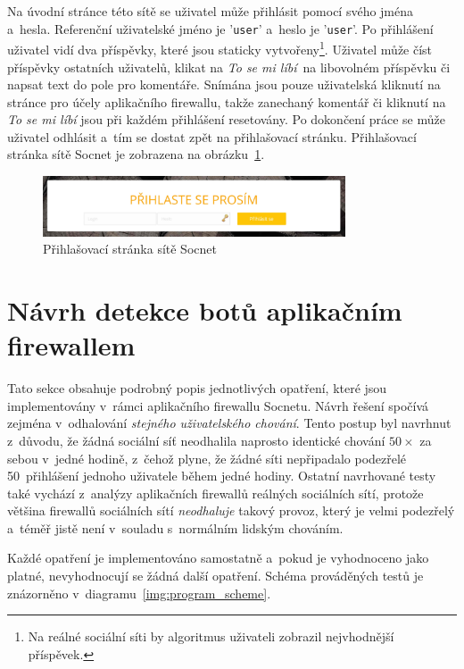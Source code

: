 Na úvodní stránce této sítě se uživatel může přihlásit pomocí svého jména a~hesla. Referenční uživatelské jméno je '\texttt{user}' a~heslo je '\texttt{user}'. Po přihlášení uživatel vidí dva příspěvky, které jsou staticky vytvořeny\footnote{Na reálné sociální síti by algoritmus uživateli zobrazil nejvhodnější příspěvek.}. Uživatel může číst příspěvky ostatních uživatelů, klikat na \textit{To se mi líbí}~na libovolném příspěvku či napsat text do pole pro komentáře. Snímána jsou pouze uživatelská kliknutí na stránce pro účely aplikačního firewallu, takže zanechaný komentář či kliknutí na \textit{To se mi líbí} jsou při každém přihlášení resetovány. Po dokončení práce se může uživatel odhlásit a~tím se dostat zpět na přihlašovací stránku. Přihlašovací stránka sítě Socnet je zobrazena na obrázku~\ref{img:socnet_intro}.

\begin{figure}[H]
	\centering
	\includegraphics[width=0.8\textwidth]{images/socnet_intro.jpg}
	\caption{Přihlašovací stránka sítě Socnet}
	\label{img:socnet_intro}
\end{figure}

\section{Návrh detekce botů aplikačním firewallem}
\label{sec:detection_proposal}
Tato sekce obsahuje podrobný popis jednotlivých opatření, které jsou implementovány v~rámci aplikačního firewallu Socnetu. Návrh řešení spočívá zejména v~odhalování \textit{stejného uživatelského chování}. Tento postup byl navrhnut z~důvodu, že žádná sociální síť neodhalila naprosto identické chování $50\times$ za sebou v~jedné hodině, z~čehož plyne, že žádné síti nepřipadalo podezřelé 50~přihlášení jednoho uživatele během jedné hodiny. Ostatní navrhované testy také vychází z~analýzy aplikačních firewallů reálných sociálních sítí, protože většina firewallů sociálních sítí \textit{neodhaluje} takový provoz, který je velmi podezřelý a~téměř jistě není v~souladu s~normálním lidským chováním.

Každé opatření je implementováno samostatně a~pokud je vyhodnoceno jako platné, nevyhodnocují se žádná další opatření. Schéma prováděných testů je znázorněno v~diagramu~\ref{img:program_scheme}.

